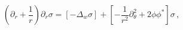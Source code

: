 \begin{equation}
\left( \partial_r +\frac 1r \right) \partial_r \sigma =
\left[ -\Delta_w \sigma \right] +
\left[ - \frac 1{r^2}\partial_\theta^2 + 2\phi\phi^* \right]\sigma
\,,\label{ginar}
\end{equation}

